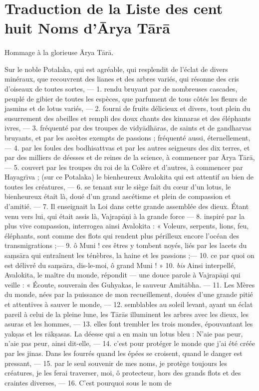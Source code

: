 \documentclass[a4paper, 11pt, oneside, french, landscape, twocolumn]{article}
\begin{document}
\section{Traduction de la Liste des cent huit Noms d'\={A}rya T\={a}r\={a}}
\paragraph{}
Hommage à la glorieuse \={A}rya T\={a}r\={a}.

\bigskip

Sur le noble Potalaka, qui est agréable, qui resplendit de l'éclat de divers minéraux, que recouvrent des lianes et des arbres variés, qui résonne des cris d'oiseaux de toutes sortes, --- 1. rendu bruyant par de nombreuses cascades, peuplé de gibier de toutes les espèces, que parfument de tous côtés les fleurs de jasmins et de lotus variés, --- 2. fourni de fruits délicieux et divers, tout plein du susurrement des abeilles et rempli des doux chants des kinnaras et des éléphants ivres, --- 3. fréquenté par des troupes de vidy\={a}dh\={a}ras, de saints et de gandharvas bruyants, et par les ascètes exempts de passions ; fréquenté aussi, éternellement, --- 4. par les foules des bodhisattvas et par les autres seigneurs des dix terres, et par des milliers de déesses et de reines de la science, à commencer par \={A}rya T\={a}r\={a}, --- 5. couvert par les troupes du roi de la Colère et d'autres, à commencer par Hayagr\={\i}va ; (sur ce Potalaka) le bienheureux Avalokita qui est attentif au bien de toutes les créatures, --- 6. se tenant sur le siège fait du cœur d'un lotus, le bienheureux était là, doué d'un grand ascétisme et plein de compassion et d'amitié. --- 7. Il enseignait la Loi dans cette grande assemblée des dieux. Étant venu vers lui, qui était assis là, Vajrap\={a}\d{n}i à la grande force --- 8. inspiré par la plus vive compassion, interrogea ainsi Avalokita : « Voleurs, serpents, lions, feu, éléphants, sont comme des flots qui rendent plus périlleux encore l'océan des transmigrations ;--- 9. ô Muni ! ces êtres y tombent noyés, liés par les lacets du sa\d{m}s\={a}ra qui entraînent les ténèbres, la haine et les passions ;--- 10. ce par quoi on est délivré du sa\d{m}s\={a}ra, dis-le-moi, ô grand Muni ! » 10. \emph{bis} Ainsi interpellé, Avalokita, le maître du monde, répondit --- une douce parole à Vajrap\={a}\d{n}i qui veille : « Écoute, souverain des Guhyakas, le sauveur Amit\={a}bha. --- 11. Les Mères du monde, nées par la puissance de mon recueillement, douées d'une grande pitié et attentives à sauver le monde, --- 12. semblables au soleil levant, ayant un éclat pareil à celui de la pleine lune, les T\={a}r\={a}s illuminent les arbres avec les dieux, les asuras et les hommes, --- 13. elles font trembler les trois mondes, épouvantant les yak\d{s}as et les r\={a}k\d{s}asas. La déesse qui a en main un lotus bleu : N'aie pas peur, n'aie pas peur, ainsi dit-elle, --- 14. c'est pour protéger le monde que j'ai été créée par les jinas. Dans les fourrés quand les épées se croisent, quand le danger est pressant, --- 15. par le seul souvenir de mes noms, je protège toujours les créatures, je les ferai traverser, moi, ô protecteur, hors des grands flots et des craintes diverses, --- 16. C'est pourquoi sous le nom de 
\end{document}
